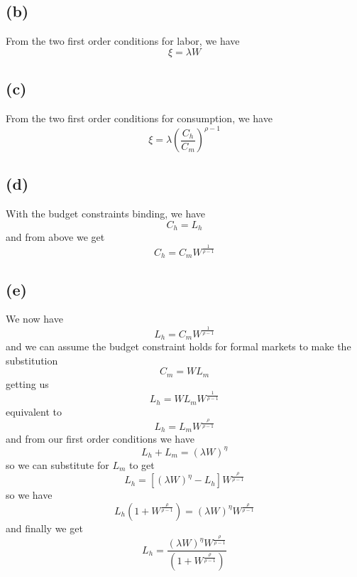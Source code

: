 \documentclass[11pt]{amsart}
\begin{document}
\subsection*{(b)}

From the two first order conditions for labor, we have 
\[
\xi = \lambda W
\]

\subsection*{(c)}

From the two first order conditions for consumption, we have
\[
\xi = \lambda \left( \frac{C_h}{C_m} \right)^{\rho-1}
\]

\subsection*{(d)}

With the budget constraints binding, we have
\[
C_h = L_h
\]
and from above we get
\[
C_h = C_m W^{\frac{1}{\rho-1}}
\]

\subsection*{(e)}

We now have
\[
L_h = C_m W^{\frac{1}{\rho-1}}
\]
and we can assume the budget constraint holds for formal markets to make the substitution
\[
C_m = WL_m
\]
getting us
\[
L_h = WL_m W^{\frac{1}{\rho-1}}
\]
equivalent to
\[
L_h = L_m W^{\frac{\rho}{\rho-1}}
\]
and from our first order conditions we have
\[
L_h + L_m = (\lambda W)^{\eta}
\]
so we can substitute for $L_m$ to get
\[
L_h =[(\lambda W)^{\eta} - L_h] W^{\frac{\rho}{\rho-1}}
\]
so we have
\[
L_h (1+ W^{\frac{\rho}{\rho-1}}) = (\lambda W)^{\eta} W^{\frac{\rho}{\rho-1}}
\]
and finally we get
\[
L_h = \frac{ (\lambda W)^{\eta} W^{\frac{\rho}{\rho-1}}}{(1+ W^{\frac{\rho}{\rho-1}})}
\]
\end{document}

